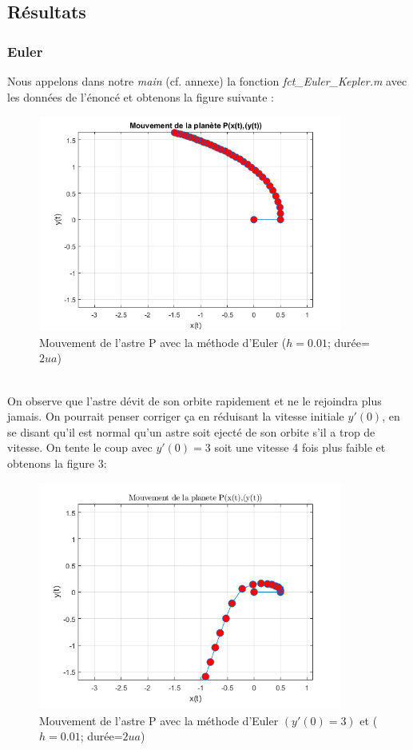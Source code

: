 \documentclass[11pt]{article} %
\begin{document}
\clearpage
\subsection{Résultats}

\subsubsection{Euler}
Nous appelons dans notre \textit{main} (cf. annexe) la fonction \textit{fct\_Euler\_Kepler.m} avec les données de l'énoncé et obtenons la figure suivante :
\begin{figure}[h]
\includegraphics[width=10cm]{fig_euler1}
\centering
\caption{Mouvement de l'astre P avec la méthode d'Euler ($h=0.01$; durée=$2ua$)}
\end{figure}
\\On observe que l'astre dévit de son orbite rapidement et ne le rejoindra plus jamais. On pourrait penser corriger ça en réduisant la vitesse initiale $y'(0)$, en se disant qu'il est normal qu'un astre soit ejecté de son orbite s'il a trop de vitesse. On tente le coup avec $y'(0)=3$ soit une vitesse 4 fois plus faible et obtenons la figure 3:
\begin{figure}[h]
\includegraphics[width=10cm]{fig_euler_vy3}
\centering
\caption{Mouvement de l'astre P avec la méthode d'Euler $(y'(0)=3)$ et ($h=0.01$; durée=$2ua$)}
\end{figure}
\end{document}
